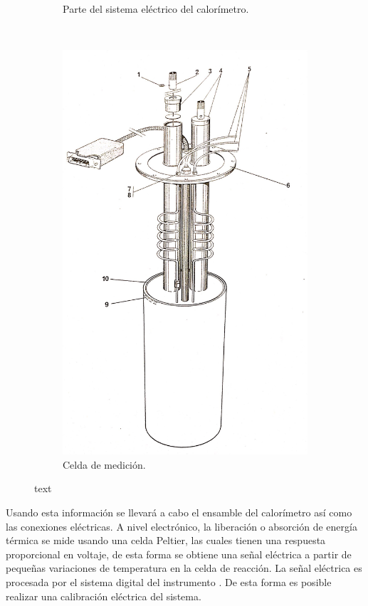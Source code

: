 \begin{figure}[h]
\begin{subfigure}[b]{0.37\textwidth}
			\caption{Parte del sistema eléctrico del calorímetro.}
			\label{fig:sistemaElectrico}
		\end{subfigure}
		~ 
		\begin{subfigure}[b]{0.25\textwidth}
			\includegraphics[width=\textwidth]{Figures/images_3.jpg}
			\caption{Celda de medición.}
			\label{fig:celda}
		\end{subfigure}
		\caption{text}
		\label{fig:partes}
	\end{figure}
	Usando esta información se llevará a cabo el ensamble del calorímetro así como las conexiones eléctricas.	A nivel electrónico, la liberación o absorción de energía térmica se mide usando una celda Peltier, las cuales tienen una respuesta proporcional en voltaje, de esta forma se obtiene una señal eléctrica a partir de pequeñas variaciones de temperatura en la celda de reacción. La señal eléctrica es procesada por el sistema digital del instrumento \cite{Suurkuusk}. De esta forma es posible realizar una calibración eléctrica del sistema.
	
